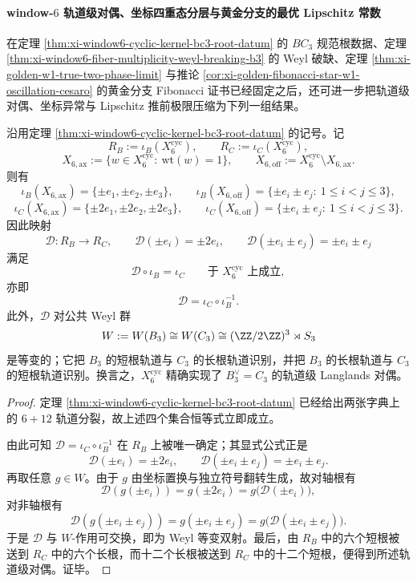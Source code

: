 \paragraph{window-\texorpdfstring{$6$}{6} 轨道级对偶、坐标四重态分层与黄金分支的最优 Lipschitz 常数}
在定理 \ref{thm:xi-window6-cyclic-kernel-bc3-root-datum} 的 \(BC_3\) 规范根数据、定理 \ref{thm:xi-window6-fiber-multiplicity-weyl-breaking-b3} 的 Weyl 破缺、定理 \ref{thm:xi-golden-w1-true-two-phase-limit} 与推论 \ref{cor:xi-golden-fibonacci-star-w1-oscillation-cesaro} 的黄金分支 Fibonacci 证书已经固定之后，还可进一步把轨道级对偶、坐标异常与 Lipschitz 推前极限压缩为下列一组结果。

\begin{theorem}[window-\texorpdfstring{$6$}{6} 的 \texorpdfstring{$X_6^{\mathrm{cyc}}$}{X6cyc} 实现 \texorpdfstring{$B_3^\vee=C_3$}{B3v=C3} 的轨道级 Langlands 对偶]\label{thm:xi-window6-b3c3-orbitwise-langlands-duality}
沿用定理 \ref{thm:xi-window6-cyclic-kernel-bc3-root-datum} 的记号。记
\[
R_B:=\iota_B(X_6^{\mathrm{cyc}}),
\qquad
R_C:=\iota_C(X_6^{\mathrm{cyc}}),
\]
\[
X_{6,\mathrm{ax}}
:=
\{w\in X_6^{\mathrm{cyc}}:\ \mathrm{wt}(w)=1\},
\qquad
X_{6,\mathrm{off}}
:=
X_6^{\mathrm{cyc}}\setminus X_{6,\mathrm{ax}}.
\]
则有
\[
\iota_B(X_{6,\mathrm{ax}})
=
\{\pm e_1,\pm e_2,\pm e_3\},
\qquad
\iota_B(X_{6,\mathrm{off}})
=
\{\pm e_i\pm e_j:\ 1\le i<j\le 3\},
\]
\[
\iota_C(X_{6,\mathrm{ax}})
=
\{\pm 2e_1,\pm 2e_2,\pm 2e_3\},
\qquad
\iota_C(X_{6,\mathrm{off}})
=
\{\pm e_i\pm e_j:\ 1\le i<j\le 3\}.
\]
因此映射
\[
\mathcal D:R_B\to R_C,
\qquad
\mathcal D(\pm e_i)=\pm 2e_i,
\qquad
\mathcal D(\pm e_i\pm e_j)=\pm e_i\pm e_j
\]
满足
\[
\mathcal D\circ \iota_B=\iota_C
\qquad\text{于 }X_6^{\mathrm{cyc}}\text{ 上成立},
\]
亦即
\[
\mathcal D=\iota_C\circ \iota_B^{-1}.
\]
此外，\(\mathcal D\) 对公共 Weyl 群
\[
W:=W(B_3)\cong W(C_3)\cong (\ZZ/2\ZZ)^3\rtimes S_3
\]
是等变的；它把 \(B_3\) 的短根轨道与 \(C_3\) 的长根轨道识别，并把 \(B_3\) 的长根轨道与 \(C_3\) 的短根轨道识别。换言之，\(X_6^{\mathrm{cyc}}\) 精确实现了 \(B_3^\vee=C_3\) 的轨道级 Langlands 对偶。
\end{theorem}
\begin{proof}
定理 \ref{thm:xi-window6-cyclic-kernel-bc3-root-datum} 已经给出两张字典上的 \(6+12\) 轨道分裂，故上述四个集合恒等式立即成立。

由此可知 \(\mathcal D=\iota_C\circ \iota_B^{-1}\) 在 \(R_B\) 上被唯一确定；其显式公式正是
\[
\mathcal D(\pm e_i)=\pm 2e_i,
\qquad
\mathcal D(\pm e_i\pm e_j)=\pm e_i\pm e_j.
\]
再取任意 \(g\in W\)。由于 \(g\) 由坐标置换与独立符号翻转生成，故对轴根有
\[
\mathcal D(g(\pm e_i))
=
g(\pm 2e_i)
=
g\bigl(\mathcal D(\pm e_i)\bigr),
\]
对非轴根有
\[
\mathcal D(g(\pm e_i\pm e_j))
=
g(\pm e_i\pm e_j)
=
g\bigl(\mathcal D(\pm e_i\pm e_j)\bigr).
\]
于是 \(\mathcal D\) 与 \(W\)-作用可交换，即为 Weyl 等变双射。最后，由 \(R_B\) 中的六个短根被送到 \(R_C\) 中的六个长根，而十二个长根被送到 \(R_C\) 中的十二个短根，便得到所述轨道级对偶。证毕。
\end{proof}

